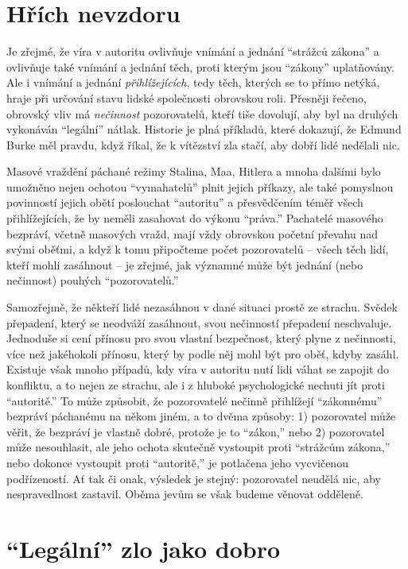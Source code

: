 \documentclass{book}
\begin{document}
\section{Hřích nevzdoru}

Je zřejmé, že víra v autoritu ovlivňuje vnímání a jednání \enquote{strážců zákona} a ovlivňuje také vnímání a jednání těch, proti kterým jsou \enquote{zákony} uplatňovány. Ale i vnímání a jednání \emph{přihlížejících}, tedy těch, kterých se to přímo netýká, hraje při určování stavu lidské společnosti obrovskou roli. Přesněji řečeno, obrovský vliv má \emph{nečinnost} pozorovatelů, kteří tiše dovolují, aby byl na druhých vykonáván \enquote{legální} nátlak. Historie je plná příkladů, které dokazují, že Edmund Burke měl pravdu, když říkal, že k vítězství zla stačí, aby dobří lidé nedělali nic.

Masové vraždění páchané režimy Stalina, Maa, Hitlera a mnoha dalšími bylo umožněno nejen ochotou \enquote{vymahatelů} plnit jejich příkazy, ale také pomyslnou povinností jejich obětí poslouchat \enquote{autoritu} a přesvědčením téměř všech přihlížejících, že by neměli zasahovat do výkonu \enquote{práva.} Pachatelé masového bezpráví, včetně masových vražd, mají vždy obrovskou početní převahu nad svými oběťmi, a když k tomu připočteme počet pozorovatelů -- všech těch lidí, kteří mohli zasáhnout -- je zřejmé, jak významné může být jednání (nebo nečinnost) pouhých \enquote{pozorovatelů.}

Samozřejmě, že někteří lidé nezasáhnou v dané situaci prostě ze strachu. Svědek přepadení, který se neodváží zasáhnout, svou nečinností přepadení neschvaluje. Jednoduše si cení přínosu pro svou vlastní bezpečnost, který plyne z nečinnosti, více než jakéhokoli přínosu, který by podle něj mohl být pro oběť, kdyby zasáhl. Existuje však mnoho případů, kdy víra v autoritu nutí lidi váhat se zapojit do konfliktu, a to nejen ze strachu, ale i z hluboké psychologické nechuti jít proti \enquote{autoritě.} To může způsobit, že pozorovatelé nečinně přihlížejí \enquote{zákonnému} bezpráví páchanému na někom jiném, a to dvěma způsoby: 1) pozorovatel může věřit, že bezpráví je vlastně dobré, protože je to \enquote{zákon,} nebo 2) pozorovatel může nesouhlasit, ale jeho ochota skutečně vystoupit proti \enquote{strážcům zákona,} nebo dokonce vystoupit proti \enquote{autoritě,} je potlačena jeho vycvičenou podřízeností. Ať tak či onak, výsledek je stejný: pozorovatel neudělá nic, aby nespravedlnost zastavil. Oběma jevům se však budeme věnovat odděleně.

\section{\enquote{Legální} zlo jako dobro}
\end{document}
